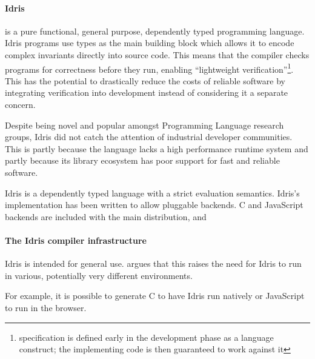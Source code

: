 \documentclass[a4paper,twocolumn]{article}
\begin{document}
\paragraph{Idris} %
is a pure functional,
general purpose, dependently typed programming language.
Idris programs use types as the main building block which allows it
to encode complex invariants directly into source code.
This means that the compiler checks programs for
correctness before they run, enabling
``lightweight verification''\footnote{specification is
	defined early in the development phase as a language construct;
	the implementing code is then guaranteed to work against it}.
This has the potential to drastically reduce the costs
of reliable software by integrating verification into development
instead of considering it a separate concern.

Despite being novel and popular amongst Programming Language research
groups, Idris did not catch the attention of industrial developer
communities.
This is partly because the language lacks a high performance
runtime system and partly because its library ecosystem has poor
support for fast and reliable software.

Idris \cite{idris} is a dependently typed language with a strict
evaluation semantics. Idris's implementation has been written to allow
pluggable backends. C and JavaScript backends are included with the
main distribution, and

\paragraph{The Idris compiler infrastructure}


Idris is intended for general use. \cite{crosscompilers} argues
that this raises the need for Idris to run in various, potentially
very different environments.

For example, it is possible to generate C to have Idris run
natively or JavaScript to run in the browser.
\end{document}
